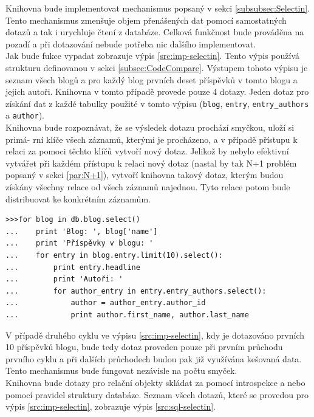 \documentclass[ing,male,java,dept456]{diploma}						%
\begin{document}
Knihovna bude implementovat mechanismus popsaný v sekci \ref{subsubsec:Selectin}. Tento mechanismus zmenšuje objem přenášených dat pomocí samostatných dotazů a tak i urychluje čtení z databáze. Celková funkčnost bude prováděna na pozadí a při dotazování nebude potřeba nic dalšího implementovat. \\
Jak bude fukce vypadat zobrazuje výpis \ref{src:imp-selectin}. Tento výpis používá strukturu definovanou v sekci \ref{subsec:CodeCompare}. Výstupem tohoto výpisu je seznam všech blogů a pro každý blog prvních deset příspěvků v tomto blogu a jejich autoři. Knihovna v tomto případě provede pouze 4 dotazy. Jeden dotaz pro získání dat z každé tabulky použité v tomto výpisu (\lstinline[style=inlinepython]|blog|, \lstinline[style=inlinepython]|entry|, \lstinline[style=inlinepython]|entry_authors| a \lstinline[style=inlinepython]|author|). \\
Knihovna bude rozpoznávat, že se výsledek dotazu prochází smyčkou, uloží si primá- rní klíče všech záznamů, kterými je procházeno, a v případě přístupu k relaci za pomoci těchto klíčů vytvoří nový dotaz. Jelikož by nebylo efektivní vytvářet při každém přístupu k relaci nový dotaz (nastal by tak N+1 problém popsaný v sekci \ref{par:N+1}), vytvoří knihovna takový dotaz, kterým budou získány všechny relace od všech záznamů najednou. Tyto relace potom bude distribuovat ke konkrétním záznamům. \\

\begin{lstlisting}[style=custompython, label=src:imp-selectin, caption={Návrh implementace samostatných dotazů v pypg}]
>>>for blog in db.blog.select()
...    print 'Blog: ', blog['name']
...    print 'Příspěvky v blogu: '
...    for entry in blog.entry.limit(10).select():
...        print entry.headline
...        print 'Autoři: '
...        for author_entry in entry.entry_authors.select():
...            author = author_entry.author_id
...            print author.first_name, author.last_name
\end{lstlisting}

V případě druhého cyklu ve výpisu \ref{src:imp-selectin}, kdy je dotazováno prvních 10 příspěvků blogu, bude tedy dotaz proveden pouze při prvním průchodu prvního cyklu a při dalších průchodech budou pak již využívána kešovaná data. Tento mechanismus bude fungovat nezávisle na počtu smyček. \\
Knihovna bude dotazy pro relační objekty skládat za pomocí introspekce a nebo pomocí pravidel struktury databáze. Seznam všech dotazů, které se provedou pro výpis \ref{src:imp-selectin}, zobrazuje výpis \ref{src:sql-selectin}.
\end{document}
